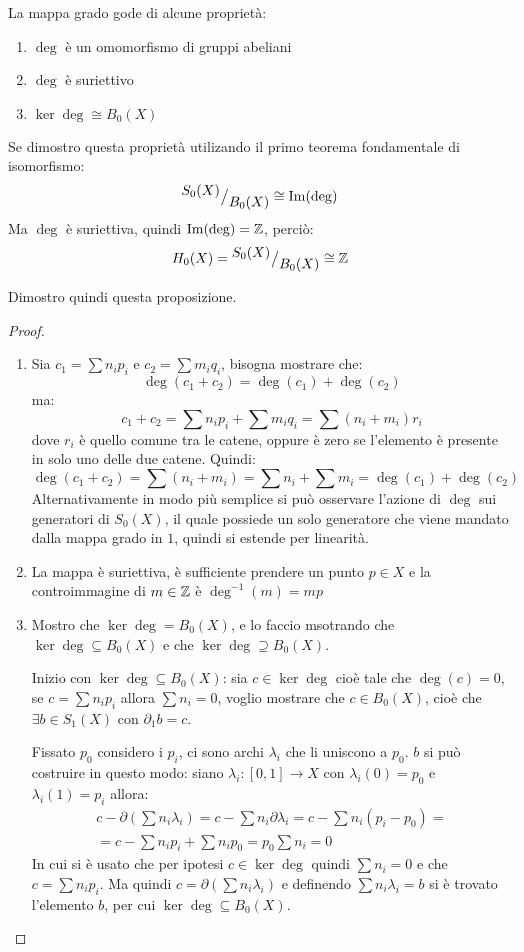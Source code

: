 \begin{proposition}
  La mappa grado gode di alcune proprietà:
  \begin{enumerate}
  \item $ \deg $ è un omomorfismo di gruppi abeliani
  \item $ \deg $ è suriettivo
  \item $ \ker{\deg} \cong B_0(X) $
  \end{enumerate}
  Se dimostro questa proprietà utilizando il primo teorema fondamentale di isomorfismo:
  \[
    {^{\textstyle S_0(X)}\big/_{\textstyle B_0(X)}} \cong \mathrm{Im}( \deg )
  \]
  Ma $ \deg $ è suriettiva, quindi $ \mathrm{Im}( \deg ) = \mathbb{Z} $, perciò:
  \[
    H_0(X) = {^{\textstyle S_0(X)}\big/_{\textstyle B_0(X)}} \cong \mathbb{Z}
  \]
\end{proposition}
Dimostro quindi questa proposizione. \\
\begin{proof}
  \begin{enumerate}
  \item
    Sia $ c_1 = \sum n_i p_i $ e $ c_2 = \sum m_i q_i $, bisogna mostrare che:
    \[
      \deg(c_1 + c_2) = \deg(c_1) + \deg(c_2)
    \]
    ma:
    \[
      c_1 + c_2 = \sum n_i p_i + \sum m_i q_i = \sum (n_i + m_i)r_i
    \]
    dove $ r_i $ è quello comune tra le catene, oppure è zero se
    l'elemento è presente in solo uno delle due catene.
    Quindi:
    \[
      \deg(c_1 + c_2) = \sum (n_i + m_i) = \sum n_i + \sum m_i = \deg(c_1) + \deg(c_2)
    \]
    Alternativamente in modo più semplice si può osservare l'azione di $ \deg $
    sui generatori di $ S_0(X) $, il quale possiede un solo generatore che viene
    mandato dalla mappa grado in $ 1 $, quindi si estende per linearità.
  \item
    La mappa è suriettiva, è sufficiente prendere un punto $ p \in X $
    e la controimmagine di $ m \in \mathbb{Z} $ è $ \deg^{-1}(m) = mp $
  \item
    Mostro che $ \ker{\deg} = B_0(X) $, e lo faccio msotrando che $ \ker{\deg} \subseteq B_0(X) $
    e che  $ \ker{\deg} \supseteq B_0(X) $.

    Inizio con $ \ker{\deg} \subseteq B_0(X) $: sia $ c \in \ker{\deg} $ cioè tale che $ \deg(c) = 0 $,
    se $ c = \sum n_i p_i $ allora $ \sum n_i = 0 $, voglio mostrare che $ c \in B_0(X) $,
    cioè che $ \exists b \in S_1(X) $ con $ \partial_1 b = c $.

    Fissato $ p_0 $ considero i $ p_i $, ci sono archi
    $ \lambda_i $ che li uniscono a $ p_0 $. $ b $ si può costruire in questo modo: siano
    $ \lambda_i : [0,1] \to X $ con $ \lambda_i(0) = p_0 $ e $ \lambda_i(1) = p_i $ allora:
    \begin{gather*}
      c - \partial\left(\sum n_i \lambda_i \right) =  c - \sum n_i \partial \lambda_i = c - \sum n_i (p_i - p_0) = \\
      = c - \sum n_i p_i
      + \sum n_i p_0 = p_0 \sum n_i = 0
    \end{gather*}
    In cui si è usato che per ipotesi $ c \in \ker{\deg} $ quindi $ \sum n_i = 0 $ e che $ c = \sum n_i p_i  $.
    Ma quindi $ c = \partial(\sum n_i \lambda_i) $ e definendo $ \sum n_i \lambda_i = b $ si è trovato l'elemento $ b $,
    per cui $ \ker{\deg} \subseteq B_0(X) $.


\end{enumerate}
\end{proof}
